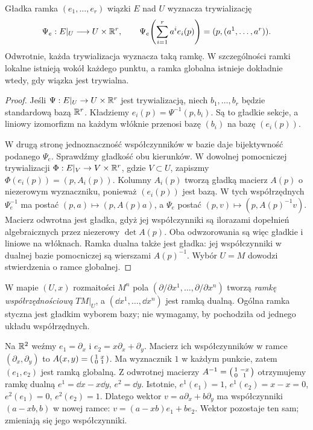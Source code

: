 \begin{stwierdzenie}
\label{prop:ramka-trywializacja}
Gładka ramka $(e_1,\ldots,e_r)$ wiązki $E$ nad $U$
wyznacza trywializację
\[
 \Psi_e:E|_U\longrightarrow U\times\mathbb{R}^r,\qquad
 \Psi_e\!\left(\sum_{i=1}^r a^i e_i(p)\right)
       =(p,(a^1,\ldots,a^r)).
\]
Odwrotnie, każda trywializacja wyznacza taką ramkę.
W szczególności ramki lokalne istnieją wokół każdego punktu,
a ramka globalna istnieje dokładnie wtedy, gdy wiązka jest trywialna.
\end{stwierdzenie}
\begin{proof}
Jeśli $\Psi:E|_U\to U\times\mathbb{R}^r$ jest trywializacją,
niech $b_1,\ldots,b_r$ będzie standardową bazą $\mathbb{R}^r$.
Kładziemy $e_i(p)=\Psi^{-1}(p,b_i)$.
Są to gładkie sekcje, a liniowy izomorfizm na każdym
włóknie przenosi bazę $(b_i)$ na bazę $(e_i(p))$.

W drugą stronę jednoznaczność współczynników w bazie
daje bijektywność podanego $\Psi_e$.
Sprawdźmy gładkość obu kierunków.
W dowolnej pomocniczej trywializacji
$\Phi:E|_V\to V\times\mathbb{R}^r$, gdzie $V\subset U$,
zapiszmy $\Phi(e_i(p))=(p,A_i(p))$.
Kolumny $A_i(p)$ tworzą gładką macierz $A(p)$
o niezerowym wyznaczniku, ponieważ $(e_i(p))$ jest bazą.
W tych współrzędnych $\Psi_e^{-1}$ ma postać
$(p,a)\mapsto(p,A(p)a)$, a $\Psi_e$ postać
$(p,v)\mapsto(p,A(p)^{-1}v)$.
Macierz odwrotna jest gładka, gdyż jej współczynniki
są ilorazami dopełnień algebraicznych przez niezerowy $\det A(p)$.
Oba odwzorowania są więc gładkie i liniowe na włóknach.
Ramka dualna także jest gładka: jej współczynniki
w dualnej bazie pomocniczej są wierszami $A(p)^{-1}$.
Wybór $U=M$ dowodzi stwierdzenia o ramce globalnej.
\end{proof}

W mapie $(U,x)$ rozmaitości $M^n$ pola
$(\partial/\partial x^1,\ldots,\partial/\partial x^n)$
tworzą \emph{ramkę współrzędnościową} $TM|_U$,
a $(\dd x^1,\ldots,\dd x^n)$ jest ramką dualną.
Ogólna ramka styczna jest gładkim wyborem bazy;
nie wymagamy, by pochodziła od jednego układu współrzędnych.

\begin{przyklad}
\label{prz:ramka-plaszczyzna}
Na $\mathbb{R}^2$ weźmy $e_1=\partial_x$ i
$e_2=x\partial_x+\partial_y$.
Macierz ich współczynników w ramce
$(\partial_x,\partial_y)$ to
$A(x,y)=\begin{psmallmatrix}1&x\\0&1\end{psmallmatrix}$.
Ma wyznacznik $1$ w każdym punkcie, zatem $(e_1,e_2)$
jest ramką globalną.
Z odwrotnej macierzy
$A^{-1}=\begin{psmallmatrix}1&-x\\0&1\end{psmallmatrix}$
otrzymujemy ramkę dualną
$e^1=\dd x-x\dd y$, $e^2=\dd y$.
Istotnie, $e^1(e_1)=1$, $e^1(e_2)=x-x=0$,
$e^2(e_1)=0$, $e^2(e_2)=1$.
Dlatego wektor $v=a\partial_x+b\partial_y$
ma współczynniki $(a-xb,b)$ w nowej ramce:
$v=(a-xb)e_1+be_2$.
Wektor pozostaje ten sam; zmieniają się jego współczynniki.
\end{przyklad}

